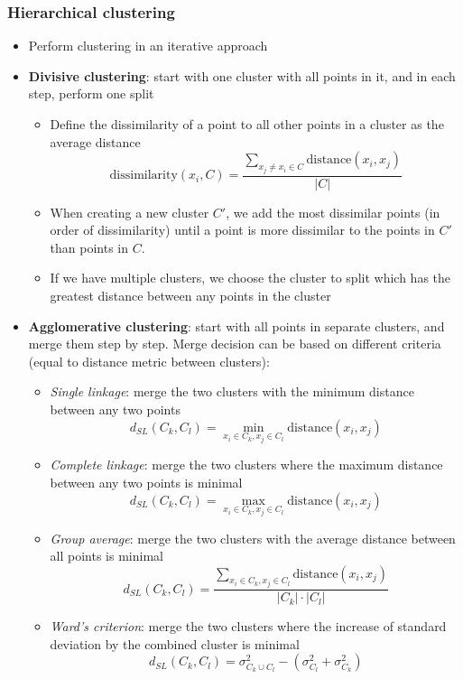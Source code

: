 \subsubsection{Hierarchical clustering}
\begin{itemize}
	\item Perform clustering in an iterative approach
	\item \textbf{Divisive clustering}: start with one cluster with all points in it, and in each step, perform one split
	\begin{itemize}
		\item Define the dissimilarity of a point to all other points in a cluster as the average distance $$\text{dissimilarity}(x_i, C)=\frac{\sum_{x_j\neq x_i \in C} \text{distance}(x_i, x_j)}{|C|}$$
		\item When creating a new cluster $C'$, we add the most dissimilar points (in order of dissimilarity) until a point is more dissimilar to the points in $C'$ than points in $C$. 
		\item If we have multiple clusters, we choose the cluster to split which has the greatest distance between any points in the cluster
	\end{itemize}
	\item \textbf{Agglomerative clustering}: start with all points in separate clusters, and merge them step by step. Merge decision can be based on different criteria (equal to distance metric between clusters):
	\begin{itemize}
		\item \textit{Single linkage}: merge the two clusters with the minimum distance between any two points
		$$d_{SL}(C_k, C_l) = \min\limits_{x_i \in C_k, x_j \in C_l} \text{distance}(x_i, x_j)$$
		\item \textit{Complete linkage}: merge the two clusters where the maximum distance between any two points is minimal
		$$d_{SL}(C_k, C_l) = \max\limits_{x_i \in C_k, x_j \in C_l} \text{distance}(x_i, x_j)$$
		\item \textit{Group average}: merge the two clusters with the average distance between all points is minimal
		$$d_{SL}(C_k, C_l) = \frac{\sum\limits_{x_i \in C_k, x_j \in C_l} \text{distance}(x_i, x_j)}{|C_k|\cdot |C_l|}$$
		\item \textit{Ward's criterion}: merge the two clusters where the increase of standard deviation by the combined cluster is minimal
		$$d_{SL}(C_k, C_l) = \sigma^2_{C_k \cup C_l} - \left(\sigma^2_{C_l} + \sigma^2_{C_k}\right)$$
	\end{itemize}
\end{itemize}
